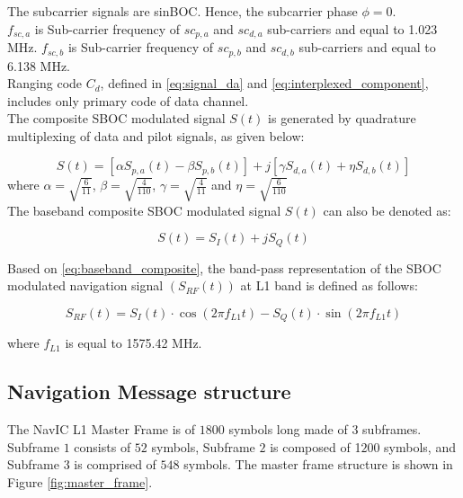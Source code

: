 \documentclass[conference]{IEEEtran}
\begin{document}
\noindent The subcarrier signals are sinBOC. Hence, the subcarrier phase $\phi=0$. \\

\noindent $f_{sc,a}$ is Sub-carrier frequency of $sc_{p,a}$ and $sc_{d,a}$ sub-carriers and equal to 1.023 MHz. 
$f_{sc,b}$ is Sub-carrier frequency of $sc_{p,b}$ and $sc_{d,b}$ sub-carriers and equal to 6.138 MHz. \\

\noindent Ranging code $C_d$, defined in \eqref{eq:signal_da} and \eqref{eq:interplexed_component}, includes only primary code of data channel. \\

\noindent The composite SBOC modulated signal $S(t)$ is generated by quadrature multiplexing of data and pilot signals, as given below:

\begin{equation}
S(t) = [\alpha S_{p,a}(t) - \beta S_{p,b}(t)] + j[\gamma S_{d,a}(t) + \eta S_{d,b}(t)]
\label{eq:composite_signal}
\end{equation}
\noindent where $\alpha = \sqrt{\frac{6}{11}}$, $\beta = \sqrt{\frac{4}{110}}$, $\gamma = \sqrt{\frac{4}{11}}$ and $\eta = \sqrt{\frac{6}{110}}$ \\
\noindent The baseband composite SBOC modulated signal $S(t)$ can also be denoted as:

\begin{equation}
S(t) = S_I(t) + jS_Q(t)
\label{eq:baseband_composite}
\end{equation}

\noindent Based on \eqref{eq:baseband_composite}, the band-pass representation of the SBOC modulated navigation signal $(S_{RF}(t))$ at L1 band is defined as follows:

\begin{equation}
S_{RF}(t) = S_I(t) \cdot \cos(2\pi f_{L1} t) - S_Q(t) \cdot \sin(2\pi f_{L1} t)
\label{eq:bandpass_representation}
\end{equation}

\noindent where \(f_{L1}\) is equal to 1575.42 MHz.

\subsection{Navigation Message structure}
The NavIC L1 Master Frame \cite{b2} is of $1800$ symbols long made of $3$ subframes. Subframe $1$ consists 
of $52$ symbols, Subframe $2$ is composed of 1$200$ symbols, and Subframe $3$ is comprised of 
$548$ 
symbols. The master frame structure is shown in Figure \ref{fig:master_frame}.
\end{document}
